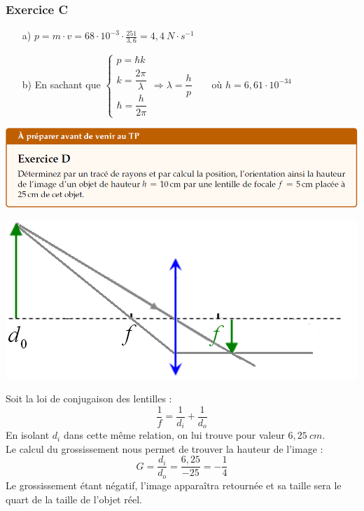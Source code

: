 \documentclass	[11pt, a4paper, openany]{book}
\begin{document}
\subsubsection*{Exercice C}
\begin{itemize}
\item[a)]$p=m\cdot v=68\cdot10^{-3}\cdot\frac{251}{3,6}=4,4\ N\cdot s^{-1}$

\item[b)] En sachant que $\left\{\begin{array}{l}
p=\hbar k  \\
k=\dfrac{2\pi}{\lambda}\\
\hbar=\dfrac{h}{2\pi}
\end{array}\right.\Rightarrow \lambda=\dfrac{h}{p}\qquad\text{où }h=6,61\cdot 10^{-34}$
\end{itemize}
\begin{center}
\includegraphics[scale=0.60]{prepa/physmD.png}\\
\end{center}
\begin{center}
\includegraphics[scale=0.60]{prepa/dessinsdegueu.png}
\end{center}
Soit la loi de conjugaison des lentilles :
$$\frac{1}{f} = \frac{1}{d_i} + \frac{1}{d_o}$$
En isolant $d_i$ dans cette même relation, on lui trouve pour valeur $6,25\ cm$.\\

Le calcul du grossissement nous permet de trouver la hauteur de l'image : 
$$G = \frac{d_i}{d_o} = \frac{6,25}{-25} = -\frac{1}{4}$$
Le grossissement étant négatif, l'image apparaîtra retournée et sa taille sera le quart de la taille de l'objet réel.
\end{document}
